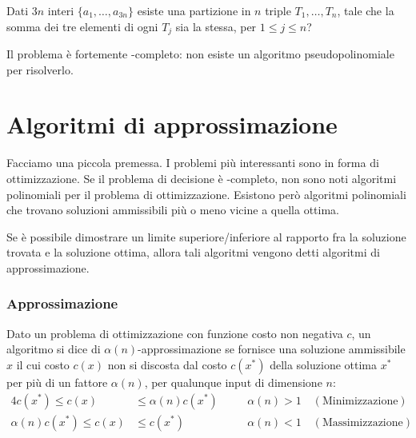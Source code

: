 Dati \(3n\) interi \(\{a_1, \dots, a_{3n}\}\) esiste una partizione in \(n\) triple \(T_1, \dots, T_n\), tale che la somma dei tre elementi di ogni \(T_j\) sia la stessa, per \(1 \leqslant j \leqslant n\)?

\begin{note}
Il problema {\treePartition} è fortemente \NP-completo: non esiste un algoritmo pseudopolinomiale per risolverlo.
\end{note}

\section{Algoritmi di approssimazione}

Facciamo una piccola premessa.
I problemi più interessanti sono in forma di ottimizzazione.
Se il problema di decisione è \NP-completo, non sono noti algoritmi polinomiali per il problema di ottimizzazione.
Esistono però algoritmi polinomiali che trovano soluzioni ammissibili più o meno vicine a quella ottima.

\begin{definition}
Se è possibile dimostrare un limite superiore/inferiore al rapporto fra la soluzione trovata e la soluzione ottima, allora tali algoritmi vengono detti \alert{algoritmi di approssimazione}.
\end{definition}

\subsubsection*{Approssimazione}

\begin{definition}
Dato un problema di ottimizzazione con funzione costo non negativa \(c\), un algoritmo si dice di \alert{\(\alpha(n)\)-approssimazione} se fornisce una soluzione ammissibile \(x\) il cui costo \(c(x)\) non si discosta dal costo \(c(x^*)\) della soluzione ottima \(x^*\) per più di un fattore \(\alpha(n)\), per qualunque input di dimensione \(n\):
\begin{alignat*}{4}
	c(x^*) \leqslant c(x)           &\leqslant \alpha(n) c(x^*) &\quad& \alpha(n) > 1 \quad (\text{Minimizzazione})\\
	\alpha(n) c(x^*) \leqslant c(x) &\leqslant c(x^*)           &\quad& \alpha(n) < 1 \quad (\text{Massimizzazione})
\end{alignat*}
\end{definition}

